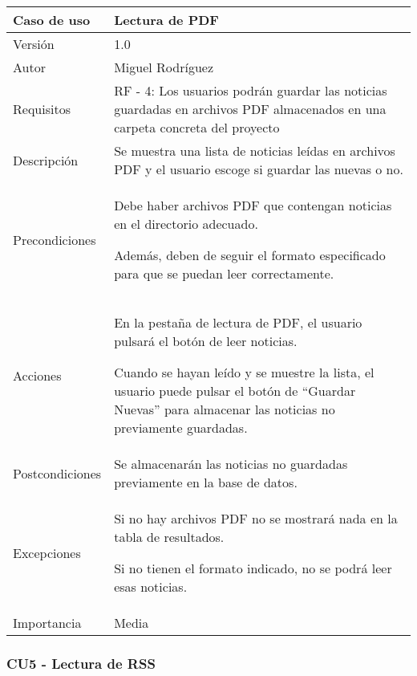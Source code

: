 \begin{center}
\begin{tabular}{ | m{3cm} | m{10cm}| } 
\hline
Caso de uso & Lectura de PDF \\ 
\hline
Versión & 1.0 \\ 
\hline
Autor & Miguel Rodríguez \\ 
\hline
Requisitos & RF - 4: Los usuarios podrán guardar las noticias guardadas en archivos PDF almacenados en una carpeta concreta del proyecto\\ 
\hline
Descripción & Se muestra una lista de noticias leídas en archivos PDF y el usuario escoge si guardar las nuevas o no. \\
\hline
Precondiciones & Debe haber archivos PDF que contengan noticias en el directorio adecuado. 

Además, deben de seguir el formato especificado para que se puedan leer correctamente. \\
\hline
Acciones & En la pestaña de lectura de PDF, el usuario pulsará el botón de leer noticias. 

Cuando se hayan leído y se muestre la lista, el usuario puede pulsar el botón de ``Guardar Nuevas'' para almacenar las noticias no previamente guardadas. \\
\hline
Postcondiciones & Se almacenarán las noticias no guardadas previamente en la base de datos. \\
\hline
Excepciones & Si no hay archivos PDF no se mostrará nada en la tabla de resultados. 

Si no tienen el formato indicado, no se podrá leer esas noticias. \\
\hline 
Importancia & Media \\
\hline 
\end{tabular}
\end{center}

\clearpage
\subsubsection{CU5 - Lectura de RSS}

